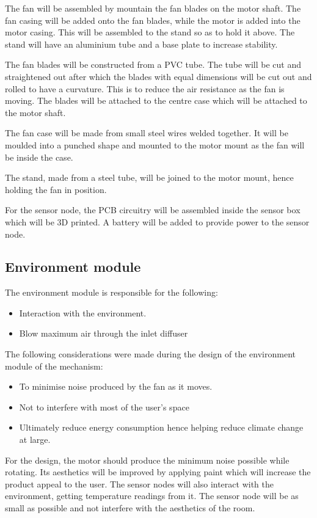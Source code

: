 The fan will be assembled by mountain the fan blades on the motor shaft. The fan casing will be added onto the fan blades, while the motor is added into the motor casing. This will be assembled to the stand so as to hold it above. The stand will have an aluminium tube and a base plate to increase stability.
\par
The fan blades will be constructed from a \ac{PVC} tube. The tube will be cut and straightened out after which the blades with equal dimensions will be cut out and rolled to have a curvature. This is to reduce the air resistance as the fan is moving. The blades will be attached to the centre case which will be attached to the motor shaft.
\par
The fan case will be made from small steel wires welded together. It will be moulded into a punched shape and mounted to the motor mount as the fan will be inside the case.
\par
The stand, made from a steel tube, will be joined to the motor mount, hence holding the fan in position. 
\par
For the sensor node, the \ac{PCB} circuitry will be assembled inside the sensor box which will be \ac{3D} printed. A battery will be added to provide power to the sensor node. 

\subsection{Environment module}

The environment module is responsible for the following:

\begin{itemize}
\item Interaction with the environment.
\item Blow maximum air through the inlet diffuser
\end{itemize}

The following considerations were made during the design of the environment module of the mechanism:
\begin{itemize}
\item To minimise noise produced by the fan as it moves.
\item Not to interfere with most of the user’s space
\item Ultimately reduce energy consumption hence helping reduce climate change at large.
\end{itemize}

For the design, the motor should produce the minimum noise possible while rotating. Its aesthetics will be improved by applying paint which will increase the product appeal to the user.
The sensor nodes will also interact with the environment, getting temperature readings from it. The sensor node will be as small as possible and not interfere with the aesthetics of the room.














